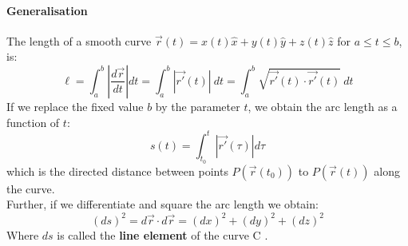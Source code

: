 \documentclass[11pt]{article}
\begin{document}
    \paragraph{Generalisation}
    The length of a smooth curve $\vec{r}(t) = x(t)\hat{x} + y(t)\hat{y} + z(t)\hat{z}$ for $a \leq t \leq b$, is:
    \begin{equation}
        \label{eq:equation10}
        \ell = \int_{a}^{b} \left| \frac{d\vec{r}}{dt} \right| dt = \int_{a}^{b} | \vec{r'}(t) | \:dt =
        \int_{a}^{b} \sqrt {\vec{r'}(t) \cdot \vec{r'}(t)} \:dt
    \end{equation}
    If we replace the fixed value $b$ by the parameter $t$, we obtain the arc length as a function of $t$:
    \begin{equation}
        \label{eq:equation11}
        s(t) = \int_{t_0}^{t} |\vec{r'}(\tau)| d\tau
    \end{equation}
    which is the directed distance between points $P(\vec{r}(t_0))$ to $P(\vec{r}(t))$ along the curve.\\
    Further, if we differentiate and square the arc length we obtain:
    \begin{equation}
        \label{eq:equation12}
        (ds)^2 = d\vec{r} \cdot d\vec{r} = (dx)^2 + (dy)^2 + (dz)^2
    \end{equation}
    Where $ds$ is called the \textbf{line element} of the curve C .
\end{document}
